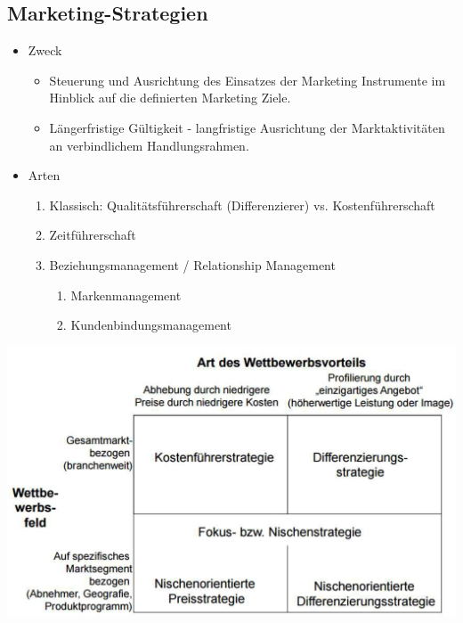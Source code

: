 \subsection{Marketing-Strategien}
\begin{itemize}
	\item Zweck
	\begin{itemize}
		\item Steuerung und Ausrichtung des Einsatzes der Marketing Instrumente im Hinblick auf die definierten Marketing Ziele.
		\item Längerfristige Gültigkeit - langfristige Ausrichtung der Marktaktivitäten an verbindlichem Handlungsrahmen.
	\end{itemize}
	\item Arten
	\begin{enumerate}
		\item Klassisch: Qualitätsführerschaft (Differenzierer) vs. Kostenführerschaft
		\item Zeitführerschaft
		\item Beziehungsmanagement / Relationship Management
		\begin{enumerate}
			\item Markenmanagement
			\item Kundenbindungsmanagement
		\end{enumerate}
	\end{enumerate}
\end{itemize}
\includegraphics[width=0.5\linewidth]{images/marketing_klassisch}

